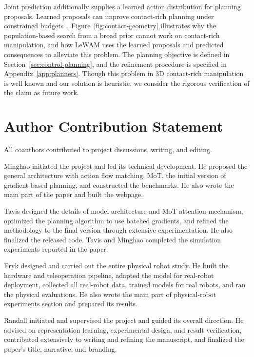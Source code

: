   Joint prediction
additionally supplies a learned action distribution for planning proposals.
Learned proposals can improve contact-rich planning under
constrained budgets~\citep{brudermuller2025gpc}. Figure~\ref{fig:contact-geometry}
illustrates why the population-based search from a broad prior cannot work on contact-rich manipulation, and how LeWAM uses the learned proposals and predicted consequences to alleviate this problem. The
planning objective is defined in Section~\ref{sec:control-planning}, and the
refinement procedure is specified in Appendix~\ref{app:planners}. Though this problem in 3D contact-rich manipulation is well known and our solution is heuristic, we consider the rigorous verification of the claim as future work.


\clearpage
\section{Author Contribution Statement}
\label{app:author-contributions}
All coauthors contributed to project discussions, writing, and editing.

Minghao initiated the project and led its technical development. He proposed the
general architecture with action flow matching, MoT, the initial version of
gradient-based planning, and constructed the benchmarks. He also wrote the main
part of the paper and built the webpage.

Tavis designed the details of model architecture and MoT attention mechanism, optimized the planning algorithm to use batched gradients, and refined the methodology to the final version through extensive experimentation. He also finalized the released code. Tavis and Minghao
completed the simulation experiments reported in the paper.

Eryk designed and carried out the entire physical robot study. He built the hardware and teleoperation pipeline, adapted the model for real-robot deployment, collected all real-robot data, trained models for real robots, and ran the physical evaluations. He also wrote the main part of physical-robot experiments section and prepared its results.

Randall initiated and supervised the project and guided its overall direction. He advised on representation learning, experimental design, and result verification, contributed extensively to writing and refining the manuscript, and finalized the paper's title, narrative, and branding.
